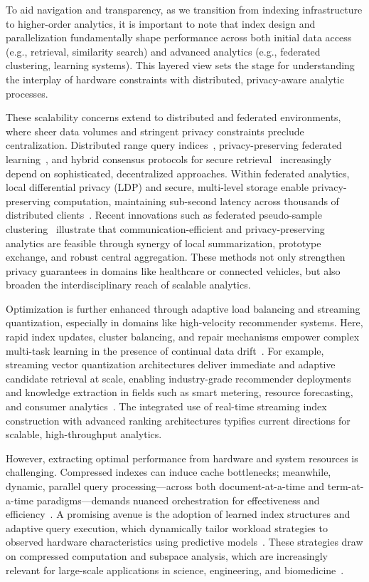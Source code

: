 \documentclass[sigconf]{acmart}
\begin{document}
To aid navigation and transparency, as we transition from indexing infrastructure to higher-order analytics, it is important to note that index design and parallelization fundamentally shape performance across both initial data access (e.g., retrieval, similarity search) and advanced analytics (e.g., federated clustering, learning systems). This layered view sets the stage for understanding the interplay of hardware constraints with distributed, privacy-aware analytic processes.

These scalability concerns extend to distributed and federated environments, where sheer data volumes and stringent privacy constraints preclude centralization. Distributed range query indices~\cite{ref39}, privacy-preserving federated learning~\cite{ref15,ref19}, and hybrid consensus protocols for secure retrieval~\cite{ref17} increasingly depend on sophisticated, decentralized approaches. Within federated analytics, local differential privacy (LDP) and secure, multi-level storage enable privacy-preserving computation, maintaining sub-second latency across thousands of distributed clients~\cite{ref19}. Recent innovations such as federated pseudo-sample clustering~\cite{ref20} illustrate that communication-efficient and privacy-preserving analytics are feasible through synergy of local summarization, prototype exchange, and robust central aggregation. These methods not only strengthen privacy guarantees in domains like healthcare or connected vehicles, but also broaden the interdisciplinary reach of scalable analytics.

Optimization is further enhanced through adaptive load balancing and streaming quantization, especially in domains like high-velocity recommender systems. Here, rapid index updates, cluster balancing, and repair mechanisms empower complex multi-task learning in the presence of continual data drift~\cite{ref75}. For example, streaming vector quantization architectures deliver immediate and adaptive candidate retrieval at scale, enabling industry-grade recommender deployments and knowledge extraction in fields such as smart metering, resource forecasting, and consumer analytics~\cite{ref32,ref75}. The integrated use of real-time streaming index construction with advanced ranking architectures typifies current directions for scalable, high-throughput analytics.

However, extracting optimal performance from hardware and system resources is challenging. Compressed indexes can induce cache bottlenecks; meanwhile, dynamic, parallel query processing—across both document-at-a-time and term-at-a-time paradigms—demands nuanced orchestration for effectiveness and efficiency~\cite{ref32,ref94}. A promising avenue is the adoption of learned index structures and adaptive query execution, which dynamically tailor workload strategies to observed hardware characteristics using predictive models~\cite{ref29,ref70,ref97,ref118}. These strategies draw on compressed computation and subspace analysis, which are increasingly relevant for large-scale applications in science, engineering, and biomedicine~\cite{ref97,ref118}.
\end{document}
